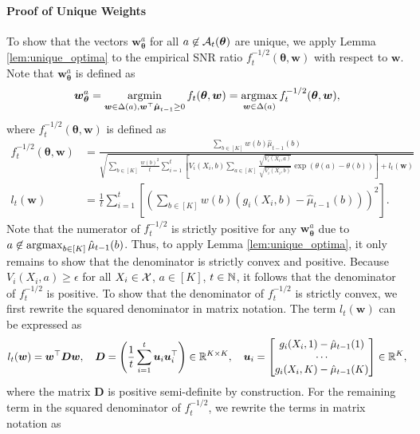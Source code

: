 \documentclass{article}
\begin{document}
\begin{appendices}
\paragraph{Proof of Unique Weights} To show that the vectors $\bm{w}_{\bm\theta}^a$ for all $a \not\in \mathcal{A}_t(\boldsymbol{\theta})$ are unique, we apply Lemma \ref{lem:unique_optima} to the empirical SNR ratio $f_t^{-1/2}(\bm{\theta}, \bm{w})$ with respect to $\bm{w}$. Note that $\bm{w}_{\bm{\theta}}^a$ is defined as
\begin{equation}
    \bm{w}_{\bm{\theta}}^a = \argmin_{\bm{w} \in \Delta(a) , \bm{w}^\top \hat{\bm{\mu}}_{t-1} \ge 0} f_t(\bm{\theta}, \bm{w}) = \argmax_{\bm{w}\in \Delta(a)} f^{-1/2}_t(\bm{\theta}, \bm{w}),
\end{equation}
where $f_t^{-1/2}(\bm{\theta}, \bm{w})$ is defined as
\begin{align}
    f_t^{-1/2}(\bm{\theta}, \bm{w}) &= \frac{\sum_{b \in [K]} w(b) \hat\mu_{t-1}(b)}{\sqrt{ \sum_{b \in [K]} \frac{w(b)^2}{t} \sum_{i=1}^t\left[V_i(X_i,b)\sum_{a \in [K]}\frac{ \sqrt{V_i(X_i,a) } }{\sqrt{V_i(X_i,b) } }\exp\left(\theta(a) - \theta(b)\right)\right] + l_t(\bm{w})}}\\
    l_t(\bm{w}) &= \frac{1}{t}\sum_{i=1}^t\left[ \left(\sum_{b \in [K]} w(b) (g_i(X_i,b)- \hat\mu_{t-1}(b)) \right)^2 \right].
\end{align}
Note that the numerator of $f_t^{-1/2}$ is strictly positive for any $\bm{w}_{\bm{\theta}}^a$ due to $a \not\in \argmax_{b \in [K]}\hat\mu_{t-1}(b)$. Thus, to apply Lemma \ref{lem:unique_optima}, it only remains to show that the denominator is strictly convex and positive. Because $V_i(X_i, a) \geq \epsilon$ for all $X_i \in \mathcal{X}$, $a \in [K]$, $t \in \mathbb{N}$, it follows that the denominator of $f_t^{-1/2}$ is positive. To show that the denominator of $f_t^{-1/2}$ is strictly convex, we first rewrite the squared denominator in matrix notation. The term $l_t(\bm{w})$ can be expressed as
\begin{equation}
    l_t(\boldsymbol{w}) = \boldsymbol{w}^\top \boldsymbol{D}\boldsymbol{w}, \quad \boldsymbol{D} = \left(\frac{1}{t}\sum_{i=1}^t \boldsymbol{u}_i\boldsymbol{u}_i^\top \right)\in \mathbb{R}^{K\times K},\quad \boldsymbol{u}_i = \begin{bmatrix} g_i(X_i, 1) - \hat\mu_{t-1}(1) \\ 
    \cdots \\
    g_i(X_i, K) - \hat\mu_{t-1}(K)\end{bmatrix} \in \mathbb{R}^K,
\end{equation}
where the matrix $\bm{D}$ is positive semi-definite by construction. For the remaining term in the squared denominator of $f_t^{-1/2}$, we rewrite the terms in matrix notation as 

\end{appendices}
\end{document}
